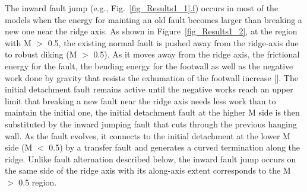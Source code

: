The inward fault jump (e.g., Fig.~\hyperref[fig_Results1_1]{\ref{fig_Results1_1}.f}) occurs in most of the models when the energy for mainting an old fault becomes larger than breaking a new one near the ridge axis. As shown in Figure~\hyperref[fig_Results1_2]{\ref{fig_Results1_2}}, at the region with M $>$ 0.5, the existing normal fault is pushed away from the ridge-axis due to robust diking (M $>$ 0.5). As it moves away from the ridge axis, the frictional energy for the fault, the bending energy for the footwall as well as the negative work done by gravity that resists the exhumation of the footwall increase [\citealp{Lavier2000, Olive2014}]. The initial detachment fault remains active until the negative works reach an upper limit that breaking a new fault near the ridge axis needs less work than to maintain the initial one, the initial detachment fault at the higher M side is then substituted by the inward jumping fault that cuts through the previous hanging wall. As the fault evolves, it connects to the initial detachment at the lower M side (M $<$ 0.5) by a transfer fault and generates a curved termination along the ridge. Unlike fault alternation described below, the inward fault jump occurs on the same side of the ridge axis with its along-axis extent corresponds to the M $>$ 0.5 region.


